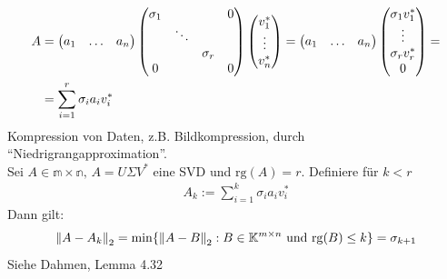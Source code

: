 \begin{align*}
  A &=\begin{pmatrix} a_1 & \ldots & a_n \end{pmatrix} \begin{pmatrix}
          \sigma_1 &        &          & 0 \\
                   & \ddots &          &   \\
                   &        & \sigma_r &   \\
          0        &        &          & 0
        \end{pmatrix} \begin{pmatrix}
          v_1^* \\ \vdots \\ v_n^* 
        \end{pmatrix}
        = \begin{pmatrix} a_1 & \ldots & a_n \end{pmatrix} \begin{pmatrix} \sigma_1 v_1^* \\ \vdots \\ \sigma_r v_r^* \\ 0 \end{pmatrix} = \\
   &= \sum^{r}_{i=1} \sigma_i a_i v_i^*
\end{align*}
Kompression von Daten, z.B. Bildkompression, durch ``Niedrigrangapproximation''.\\
\satz Sei $A \in \mathbb{m \times n},\, A = U \Sigma V^*$ eine SVD und $\mathrm{rg}(A) = r$.
Definiere für $k < r$
\begin{align*}
  A_k := \sum^{k}_{i=1} \sigma_i a_i v_i^*
\end{align*}
Dann gilt:
\begin{align*}
  \left\lVert A - A_k \right\rVert_2 = \min \{ \left\lVert A - B \right\rVert_2: B \in \mathbb{K}^{m \times n} \text{ und } \mathrm{rg}(B) \leq k \} = \sigma_{k+1}
\end{align*}
\beweis Siehe Dahmen, Lemma 4.32\\

